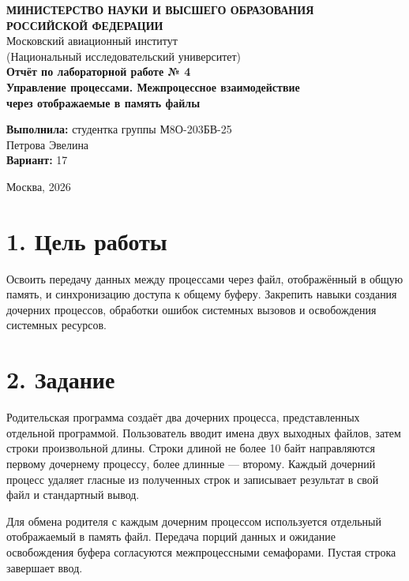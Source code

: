 \documentclass[12pt,a4paper]{article}
\begin{document}
\begin{titlepage}
\begin{center}
\Large\textbf{МИНИСТЕРСТВО НАУКИ И ВЫСШЕГО ОБРАЗОВАНИЯ\\РОССИЙСКОЙ ФЕДЕРАЦИИ}\\
\vspace{1cm}
\large Московский авиационный институт\\
(Национальный исследовательский университет)\\
\vspace{2cm}
\Large\textbf{Отчёт по лабораторной работе № 4}\\
\vspace{0.5cm}
\large\textbf{Управление процессами. Межпроцессное взаимодействие\\через отображаемые в память файлы}\\
\vspace{3cm}
\begin{flushright}
\normalsize\textbf{Выполнила:} студентка группы М8О-203БВ-25\\
Петрова Эвелина\\
\textbf{Вариант:} 17
\end{flushright}
\vfill
\large Москва, 2026
\end{center}
\end{titlepage}
\newpage
\section*{1. Цель работы}
Освоить передачу данных между процессами через файл, отображённый в общую память, и синхронизацию доступа к общему буферу. Закрепить навыки создания дочерних процессов, обработки ошибок системных вызовов и освобождения системных ресурсов.

\section*{2. Задание}
Родительская программа создаёт два дочерних процесса, представленных отдельной программой. Пользователь вводит имена двух выходных файлов, затем строки произвольной длины. Строки длиной не более 10 байт направляются первому дочернему процессу, более длинные --- второму. Каждый дочерний процесс удаляет гласные из полученных строк и записывает результат в свой файл и стандартный вывод.

Для обмена родителя с каждым дочерним процессом используется отдельный отображаемый в память файл. Передача порций данных и ожидание освобождения буфера согласуются межпроцессными семафорами. Пустая строка завершает ввод.
\end{document}
